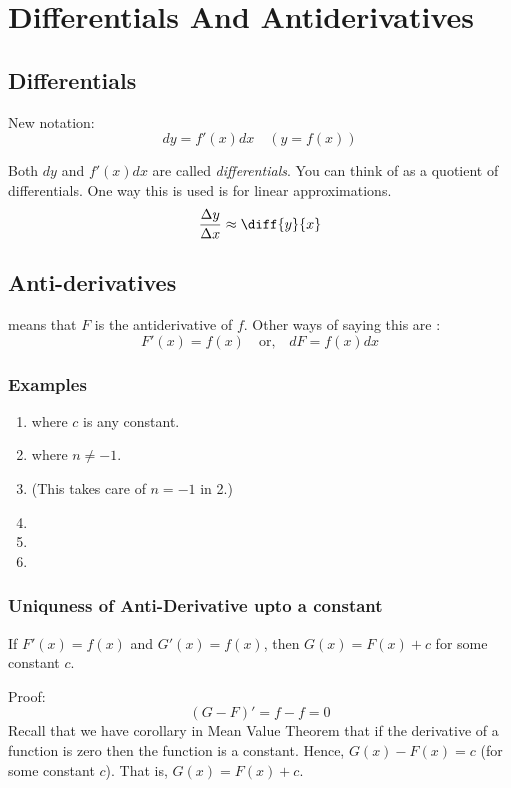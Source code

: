

\chapter{Differentials And Antiderivatives}

\bigbreak

\section{Differentials}

New notation:
$$ \boxed{ dy = f'(x)dx } \quad ( y = f(x) ) $$

Both $dy$ and $f'(x)dx$ are called \textit{differentials}. 
You can think of  as a quotient of differentials.
One way this is used is for linear approximations.
$$\frac{\Delta y}{\Delta x} \approx \diff{y}{x} $$

\section{Anti-derivatives}
 means that $F$ is the antiderivative of $f$.
Other ways of saying this are :
$$ F'(x) = f(x) \quad \text{or,} \quad dF = f(x)dx $$

\subsection*{Examples}
\begin{enumerate}
    \item {} where $c$ is any constant.
    \item {} where $n \neq -1$.
    \item {} (This takes care of $n = -1$ in 2.)
    \item {}
    \item {}
    \item {}
\end{enumerate}


\subsection*{Uniquness of Anti-Derivative upto a constant}
If $F'(x) = f(x)$ and $G'(x) = f(x)$, then $G(x) = F(x) + c$ for some constant $c$.

Proof: $$(G-F)' = f - f = 0$$
Recall that we have corollary in Mean Value Theorem that if the derivative of a function is zero then the function is a constant.
Hence, $G(x) - F(x) = c$ (for some constant $c$). That is, $G(x) = F(x) +c$.
